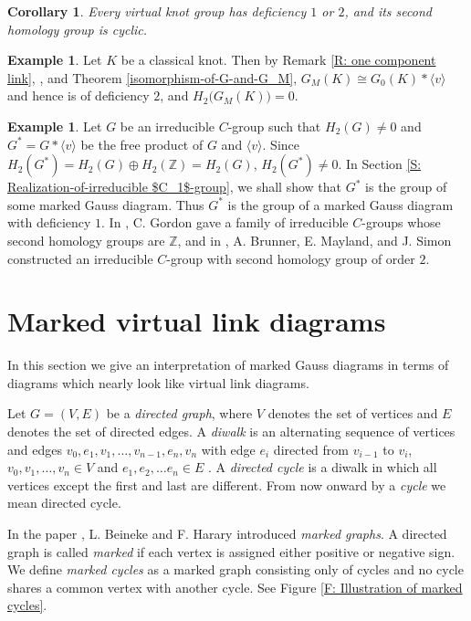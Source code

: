 \documentclass[11 pt, reqno]{amsart}
\newtheorem{corollary}[theorem]{Corollary}
\theoremstyle{definition}
\newtheorem{example}[theorem]{Example}
\numberwithin{equation}{subsection}
\begin{document}
\begin{corollary}
Every virtual knot group has deficiency $1$ or $2$, and its second homology group is cyclic.
\end{corollary}

\begin{example}
Let $K$ be a classical knot. Then by Remark \ref{R: one component link}, \cite[Proposition 4]{BB-1}, and Theorem \ref{isomorphism-of-G-and-G_M}, $G_M(K) \cong G_0(K) * \langle v \rangle$ and hence is of deficiency $2$, and $H_2\big(G_M(K)\big)=0$.
\end{example}

\begin{example}\label{ex:Group-of-general-Gauss-diagram}
Let $G$ be an irreducible $C$-group such that $H_2(G) \neq 0$ and $G^*=G * \langle v \rangle$ be the free product of $G$ and $\langle v \rangle$. Since $H_2(G^*)=H_2(G) \oplus H_2(\mathbb{Z})=H_2(G)$, $H_2(G^*) \neq 0$. In Section \ref{S: Realization-of-irreducible $C_1$-group}, we shall show that $G^*$ is the group of some marked Gauss diagram. Thus $G^*$ is the group of a marked Gauss diagram with deficiency $1$. In \cite{Gordon-1}, C. Gordon gave a family of irreducible $C$-groups whose second homology groups are $\mathbb{Z}$, and in \cite{BMS-1}, A. Brunner, E. Mayland, and J. Simon constructed an irreducible $C$-group with second homology group of order $2$.
\end{example}


\section{Marked virtual link diagrams}\label{S: Marked virtual link diagrams}
In this section we give an interpretation of marked Gauss diagrams in terms of diagrams which nearly look like virtual link diagrams.
\par

Let $G=(V,E)$ be a {\it directed graph}, where $V$ denotes the set of vertices and $E$ denotes the set of directed edges. A {\it diwalk} 
is an alternating sequence of vertices and edges $v_0, e_1, v_1, \ldots, v_{n-1}, e_n, v_n$ with edge $e_i$ directed from $v_{i-1} $ to $v_i$, $v_0, v_1, \ldots, v_n \in V$ and $e_1, e_2, \ldots e_n \in E$ . A {\it directed cycle} is a diwalk in which all vertices except the first and last are different. From now onward by a {\it cycle} we mean directed cycle.
\par
In the paper \cite{BH-1}, L. Beineke and F. Harary introduced {\it marked graphs}. A directed graph is called {\it marked} if each vertex is assigned either positive or negative sign. We define {\it marked cycles} as a marked graph consisting only of cycles and no cycle shares a common vertex with another cycle. See Figure \ref{F: Illustration of marked cycles}.
\par
 
\end{document}
